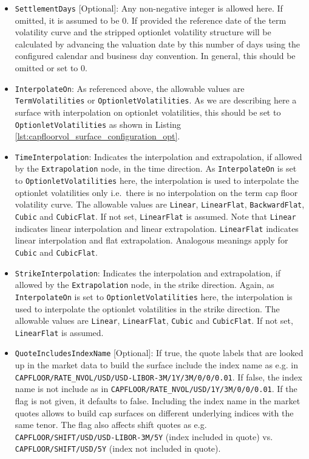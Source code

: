 \begin{itemize}
\item \lstinline!SettlementDays! [Optional]:
Any non-negative integer is allowed here. If omitted, it is assumed to be 0. If provided the reference date of the term volatility curve and the stripped optionlet volatility structure will be calculated by advancing the valuation date by this number of days using the configured calendar and business day convention. In general, this should be omitted or set to 0.

\item \lstinline!InterpolateOn!:
As referenced above, the allowable values are \lstinline!TermVolatilities! or \lstinline!OptionletVolatilities!. As we are describing here a surface with interpolation on optionlet volatilities, this should be set to \lstinline!OptionletVolatilities! as shown in Listing \ref{lst:capfloorvol_surface_configuration_opt}.

\item \lstinline!TimeInterpolation!:
Indicates the interpolation and extrapolation, if allowed by the \lstinline!Extrapolation! node, in the time direction. As \lstinline!InterpolateOn! is set to \lstinline!OptionletVolatilities! here, the interpolation is used to interpolate the optionlet volatilities only i.e.\ there is no interpolation on the term cap floor volatility curve. The allowable values are \lstinline!Linear!, \lstinline!LinearFlat!, \lstinline!BackwardFlat!, \lstinline!Cubic! and \lstinline!CubicFlat!. If not set, \lstinline!LinearFlat! is assumed. Note that \lstinline!Linear! indicates linear interpolation and linear extrapolation. \lstinline!LinearFlat! indicates linear interpolation and flat extrapolation. Analogous meanings apply for \lstinline!Cubic! and \lstinline!CubicFlat!.

\item \lstinline!StrikeInterpolation!:
Indicates the interpolation and extrapolation, if allowed by the \lstinline!Extrapolation! node, in the strike direction. Again, as \lstinline!InterpolateOn! is set to \lstinline!OptionletVolatilities! here, the interpolation is used to interpolate the optionlet volatilities in the strike direction. The allowable values are \lstinline!Linear!, \lstinline!LinearFlat!, \lstinline!Cubic! and \lstinline!CubicFlat!. If not set, \lstinline!LinearFlat! is assumed.

\item \lstinline!QuoteIncludesIndexName! [Optional]:
If true, the quote labels that are looked up in the market data to build the surface include the index name as e.g. in \lstinline!CAPFLOOR/RATE_NVOL/USD/USD-LIBOR-3M/1Y/3M/0/0/0.01!. If false, the index name is not include as in \lstinline!CAPFLOOR/RATE_NVOL/USD/1Y/3M/0/0/0.01!. If the flag is not given, it defaults to false. Including the index name in the market quotes allows to build cap surfaces on different underlying indices with the same tenor. The flag also affects shift quotes as e.g. \lstinline!CAPFLOOR/SHIFT/USD/USD-LIBOR-3M/5Y! (index included in quote) vs. \lstinline!CAPFLOOR/SHIFT/USD/5Y! (index not included in quote).


\end{itemize}
